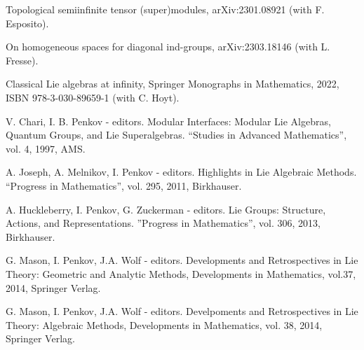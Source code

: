 \documentclass[11pt]{amsart}
\begin{document}
\myss \label{90.} Topological semiinfinite tensor (super)modules, arXiv:2301.08921 (with F. Esposito).

\myss \label{91.} On homogeneous spaces for diagonal ind-groups, arXiv:2303.18146 (with L. Fresse).

\vspace*{1cm}
\medskip

\myss \label{1.} Classical Lie algebras at infinity, Springer Monographs in Mathematics, 2022, ISBN 978-3-030-89659-1 (with C. Hoyt).

\vspace*{1cm}
\medskip

\myss \label{1.} V. Chari, I. B. Penkov - editors. Modular Interfaces: Modular Lie Algebras,
Quantum Groups, and Lie Superalgebras. ``Studies in Advanced Mathematics'', vol. 4, 1997, AMS. 

\myss \label{2.} A. Joseph, A. Melnikov, I. Penkov - editors. Highlights in Lie Algebraic Methods. ``Progress
in Mathematics'', vol. 295, 2011,  Birkhauser.

\myss \label{3.} A. Huckleberry, I. Penkov, G. Zuckerman - editors. Lie Groups: Structure, Actions, and Representations. ''Progress in Mathematics'', vol. 306, 2013, Birkhauser.

\myss \label{4.} G. Mason, I. Penkov, J.A. Wolf - editors. Developments and Retrospectives in Lie Theory: Geometric and Analytic Methods, Developments in Mathematics, vol.37, 2014, Springer Verlag.

\myss \label{5.} G. Mason, I. Penkov, J.A. Wolf - editors. Develpoments and Retrospectives in Lie Theory: Algebraic Methods, Developments in Mathematics, vol. 38, 2014, Springer Verlag.
\end{document}
